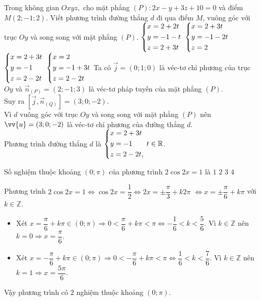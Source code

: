 \begin{ex}%
 Trong không gian $Oxyz,$ cho mặt phẳng $(P) \colon 2x-y+3z+10=0$ và điểm $M(2;-1;2)$. Viết phương trình đường thẳng $d$ đi qua điểm $M$, vuông góc với trục $Oy$ và song song với mặt phẳng $(P)$.
 \choice
  {$\left\{\begin{aligned}&x=2+2t\\&y=-1-t\\&z=2+3t\end{aligned}\right.$}
  {$\left\{\begin{aligned}&x=2+3t\\&y=-1-2t\\&z=2\end{aligned}\right.$}
  {\True $\left\{\begin{aligned}&x=2+3t\\&y=-1\\&z=2-2t\end{aligned}\right.$}
  {$\left\{\begin{aligned}&x=2\\&y=-1+3t\\&z=2-2t\end{aligned}\right.$}
 \loigiai
  {
  Ta có $\vec{j}=(0;1;0)$ là véc-tơ chỉ phương của trục $Oy$ và $\vec{n}_{(P)}=(2;-1;3)$ là véc-tơ pháp tuyến của mặt phẳng $(P)$.\\
  Suy ra $\left[\vec{j},\vec{n}_{(Q)}\right]=(3;0;-2)$.\\
  Vì $d$ vuông góc với trục $Oy$ và song song với mặt phẳng $(P)$ nên $\vv{u}=(3;0;-2)$ là véc-tơ chỉ phương của đường thẳng $d$.\\
  Phương trình đường thẳng $d$ là $\left\{\begin{aligned}&x=2+3t\\&y=-1\\&z=2-2t,\end{aligned}\right. \,t \in \mathbb{R}$.
  }
\end{ex}


\begin{ex}%
 Số nghiệm thuộc khoảng $(0;\pi)$ của phương trình $2\cos2x=1$ là
 \choice
  {$1$}
  {\True $2$}
  {$3$}
  {$4$}
 \loigiai
  {
  Phương trình $2\cos2x=1\Leftrightarrow \cos2x=\dfrac{1}{2}\Leftrightarrow 2x=\pm \dfrac{\pi}{3}+k2\pi$ 
  $\Leftrightarrow x=\pm \dfrac{\pi}{6}+k\pi$ với $k\in \mathbb{Z}$.
  \begin{itemize}
   \item Xét $x=\dfrac{\pi}{6}+k\pi\in (0;\pi)\Rightarrow 0<\dfrac{\pi}{6}+k\pi<\pi \Leftrightarrow -\dfrac{1}{6}<k<\dfrac{5}{6}.$ Vì $k\in \mathbb{Z}$ nên $k=0\Rightarrow x=\dfrac{\pi}{6}$.
   \item Xét $x=-\dfrac{\pi}{6}+k\pi\in (0;\pi)\Rightarrow 0<-\dfrac{\pi}{6}+k\pi<\pi \Leftrightarrow \dfrac{1}{6}<k<\dfrac{7}{6}.$ Vì $k\in \mathbb{Z}$ nên $k=1\Rightarrow x=\dfrac{5\pi}{6}$.
  \end{itemize}
  Vậy phương trình có $2$ nghiệm thuộc khoảng $(0;\pi)$.
  }
\end{ex}



